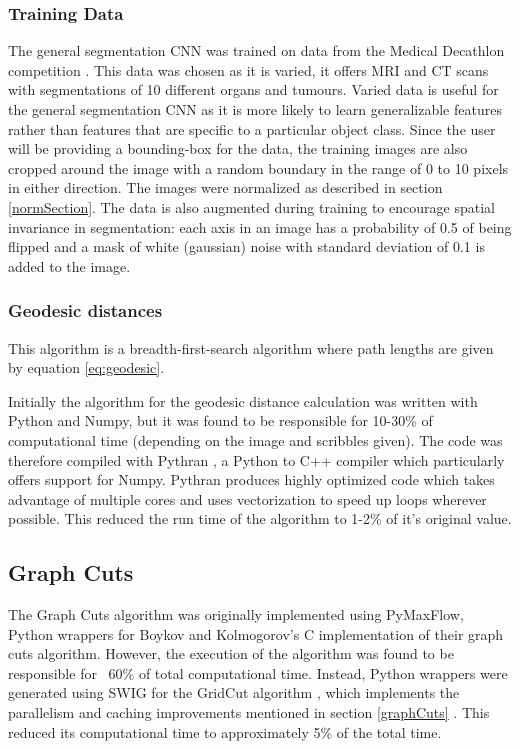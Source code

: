 \subsubsection{Training Data}
The general segmentation CNN was trained on data from the Medical Decathlon competition \cite{Decathlon}. This data was chosen as it is varied, it offers MRI and CT scans with segmentations of 10 different organs and tumours. Varied data is useful for the general segmentation CNN as it is more likely to learn generalizable features rather than features that are specific to a particular object class. Since the user will be providing a bounding-box for the data, the training images are also cropped around the image with a random boundary in the range of 0 to 10 pixels in either direction. The images were normalized as described in section \ref{normSection}.  The data is also augmented during training to encourage spatial invariance in segmentation: each axis in an image has a probability of 0.5 of being flipped and a mask of white (gaussian) noise with standard deviation of 0.1 is added to the image.

\subsubsection{Geodesic distances}
This algorithm is a breadth-first-search algorithm where path lengths are given by equation \ref{eq:geodesic}.

Initially the algorithm for the geodesic distance calculation was written with Python and Numpy, but it was found to be responsible for 10-30\% of computational time (depending on the image and scribbles given). The code was therefore compiled with Pythran \cite{Pythran}, a Python to C++ compiler which particularly offers support for Numpy. Pythran produces highly optimized code which takes advantage of multiple cores and uses vectorization to speed up loops wherever possible. This reduced the run time of the algorithm to 1-2\% of it's original value.



\subsection{Graph Cuts}
The Graph Cuts algorithm was originally implemented using PyMaxFlow, Python wrappers for Boykov and Kolmogorov's C implementation of their graph cuts algorithm. However, the execution of the algorithm was found to be responsible for ~60\% of total computational time. Instead, Python wrappers were generated using SWIG \cite{swig} for the GridCut algorithm \cite{gridCutWebsite}, which implements the parallelism and caching improvements mentioned in section \ref{graphCuts} \cite{BottomUpGraphCuts,GridCuts}. This reduced its computational time to approximately 5\% of the total time.

